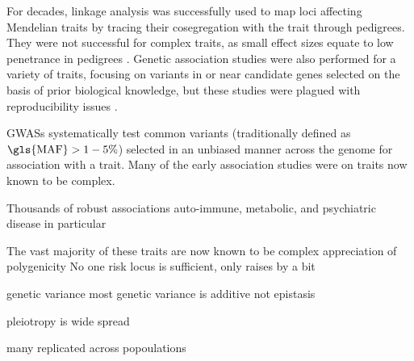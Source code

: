 \begin{outline}
\1 For decades, linkage analysis was successfully used to map loci affecting Mendelian traits by tracing their cosegregation with the trait through pedigrees.
They were not successful for complex traits, as small effect sizes equate to low penetrance in pedigrees \autocite{visscher2012FiveYearsGWAS}.
Genetic association studies were also performed for a variety of traits, focusing on variants in or near candidate genes selected on the basis of prior biological knowledge,
but these studies were plagued with reproducibility issues \autocite{hirschhorn2002ComprehensiveReviewGenetic}.

\1 \Glspl{GWAS} systematically test common variants (traditionally defined as $\text{\gls{MAF}} > 1-5\%$) selected in an unbiased manner across the genome for association with a trait.
Many of the early association studies were on traits now known to be complex.


Thousands of robust associations 
auto-immune, metabolic, and psychiatric disease in particular
\autocite{visscher2012FiveYearsGWAS,visscher201710YearsGWAS}

The vast majority of these traits are now known to be complex
appreciation of polygenicity
No one risk locus is sufficient, only raises by a bit

genetic variance
most genetic variance is additive \autocite{visscher2019Fisher1918Paper}
not epistasis

pleiotropy is wide spread \autocite{visscher2012FiveYearsGWAS}

many replicated across popoulations \autocite{visscher2012FiveYearsGWAS}



\end{outline}
